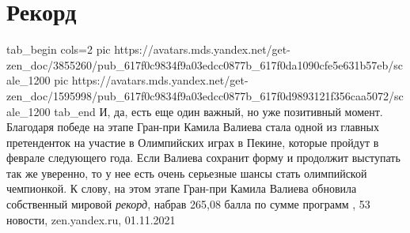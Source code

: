  
 
 
 
 
\chapter{Рекорд}


\ifcmt
  tab_begin cols=2
     pic https://avatars.mds.yandex.net/get-zen_doc/3855260/pub_617f0c9834f9a03edcc0877b_617f0da1090cfe5e631b57eb/scale_1200
     pic https://avatars.mds.yandex.net/get-zen_doc/1595998/pub_617f0c9834f9a03edcc0877b_617f0d9893121f356caa5072/scale_1200
  tab_end
\fi
И, да, есть еще один важный, но уже позитивный момент. Благодаря победе на
этапе Гран-при Камила Валиева стала одной из главных претенденток на участие в
Олимпийских играх в Пекине, которые пройдут в феврале следующего года. Если
Валиева сохранит форму и продолжит выступать так же уверенно, то у нее есть
очень серьезные шансы стать олимпийской чемпионкой.  К слову, на этом этапе
Гран-при Камила Валиева обновила собственный мировой \emph{рекорд}, набрав
265,08 балла по сумме программ
, 
53 новости, zen.yandex.ru, 01.11.2021

